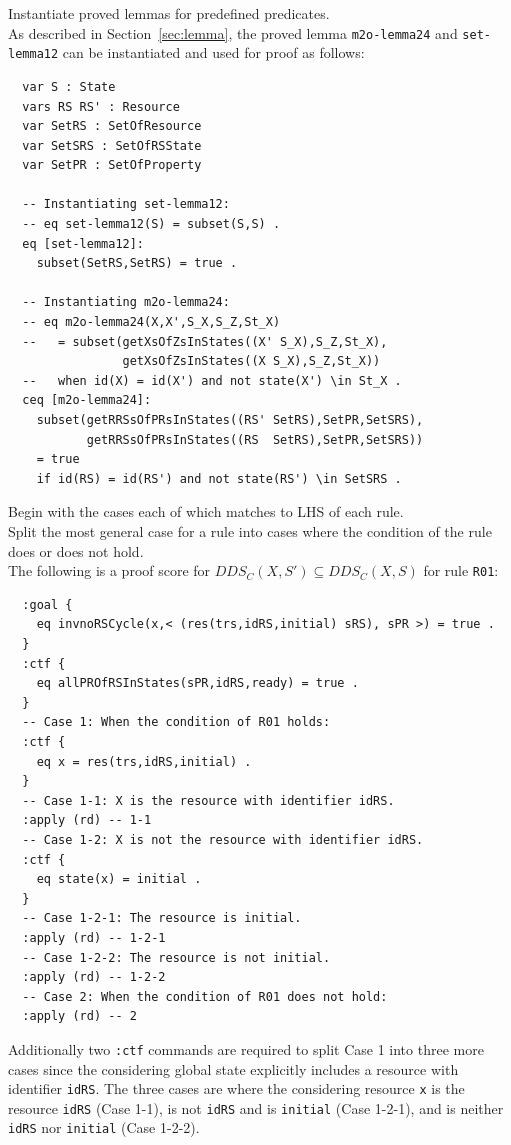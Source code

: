 \documentclass[12pt]{report}
\begin{document}
\vspace{0.3cm}
 Instantiate proved lemmas for predefined
predicates. \\ As described in Section~\ref{sec:lemma}, the proved
lemma {\tt m2o-lemma24} and {\tt set-lemma12} can be instantiated and
used for proof as follows:
\small
\begin{verbatim}
  var S : State
  vars RS RS' : Resource
  var SetRS : SetOfResource
  var SetSRS : SetOfRSState
  var SetPR : SetOfProperty

  -- Instantiating set-lemma12:
  -- eq set-lemma12(S) = subset(S,S) .
  eq [set-lemma12]:
    subset(SetRS,SetRS) = true .

  -- Instantiating m2o-lemma24:
  -- eq m2o-lemma24(X,X',S_X,S_Z,St_X)
  --   = subset(getXsOfZsInStates((X' S_X),S_Z,St_X),
                getXsOfZsInStates((X S_X),S_Z,St_X))
  --   when id(X) = id(X') and not state(X') \in St_X .
  ceq [m2o-lemma24]:
    subset(getRRSsOfPRsInStates((RS' SetRS),SetPR,SetSRS),
           getRRSsOfPRsInStates((RS  SetRS),SetPR,SetSRS))
    = true
    if id(RS) = id(RS') and not state(RS') \in SetSRS .
\end{verbatim}
\normalsize

\vspace{0.3cm}
 Begin with the cases each of which matches to
LHS of each rule. \\ 
 Split the most general case for a rule into
cases where the condition of the rule does or does not hold. \\

\vspace{0.3cm}
The following is a proof score for $DDS_C(X,S')\subseteq DDS_C(X,S)$ for
rule {\tt R01}:
\small
\begin{verbatim}
  :goal {
    eq invnoRSCycle(x,< (res(trs,idRS,initial) sRS), sPR >) = true .
  }
  :ctf {
    eq allPROfRSInStates(sPR,idRS,ready) = true .
  }
  -- Case 1: When the condition of R01 holds:
  :ctf {
    eq x = res(trs,idRS,initial) .
  }
  -- Case 1-1: X is the resource with identifier idRS.
  :apply (rd) -- 1-1
  -- Case 1-2: X is not the resource with identifier idRS.
  :ctf {
    eq state(x) = initial .
  }
  -- Case 1-2-1: The resource is initial.
  :apply (rd) -- 1-2-1
  -- Case 1-2-2: The resource is not initial.
  :apply (rd) -- 1-2-2
  -- Case 2: When the condition of R01 does not hold:
  :apply (rd) -- 2
\end{verbatim}
\normalsize
Additionally two {\tt :ctf} commands are required to split Case 1 into
three more cases since the considering global state explicitly
includes a resource with identifier {\tt idRS}. The three cases are
where the considering resource {\tt x} is the resource {\tt idRS}
(Case 1-1), is not {\tt idRS} and is {\tt initial} (Case 1-2-1), and
is neither {\tt idRS} nor {\tt initial} (Case 1-2-2).\\
\end{document}
